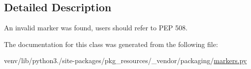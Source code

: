 \subsection{Detailed Description}
\begin{DoxyVerb}An invalid marker was found, users should refer to PEP 508.
\end{DoxyVerb}
 

The documentation for this class was generated from the following file\+:\begin{DoxyCompactItemize}
\item 
venv/lib/python3./site-\/packages/pkg\+\_\+resources/\+\_\+vendor/packaging/\hyperlink{pkg__resources_2__vendor_2packaging_2markers_8py}{markers.\+py}\end{DoxyCompactItemize}
